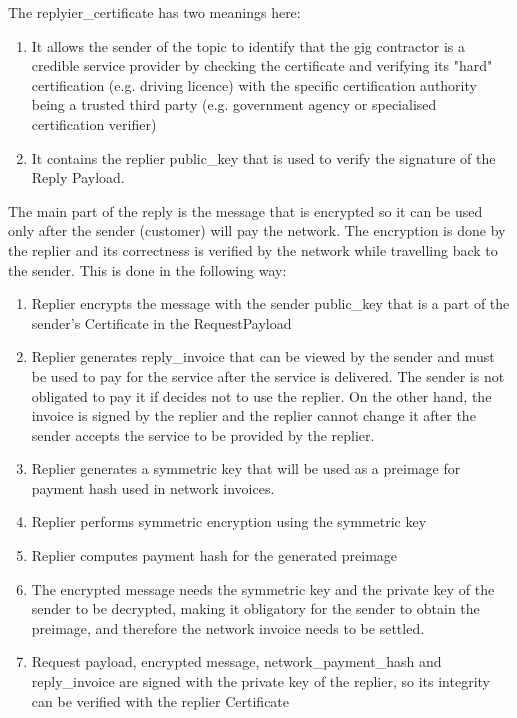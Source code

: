\documentclass{article}
\begin{document}
The replyier\_certificate has two meanings here:

\begin{enumerate}
	\item It allows the sender of the topic to identify that the gig contractor is a credible service provider by checking the certificate and verifying its "hard" certification (e.g. driving licence) with the specific certification authority being a trusted third party (e.g. government agency or specialised certification verifier)
	\item It contains the replier public\_key that is used to verify the signature of the Reply Payload.
\end{enumerate}

The main part of the reply is the message that is encrypted so it can be used only after the sender (customer) will pay the network. The encryption is done by the replier and its correctness is verified by the network while travelling back to the sender. This is done in the following way:

\begin{enumerate}
	\item Replier encrypts the message with the sender public\_key that is a part of the sender's Certificate in the RequestPayload
	\item Replier generates reply\_invoice that can be viewed by the sender and must be used to pay for the service after the service is delivered. The sender is not obligated to pay it if decides not to use the replier. On the other hand, the invoice is signed by the replier and the replier cannot change it after the sender accepts the service to be provided by the replier.
	\item Replier generates a symmetric key that will be used as a preimage for payment hash used in network invoices.
	\item Replier performs symmetric encryption using the symmetric key
	\item Replier computes payment hash for the generated preimage
	\item The encrypted message needs the symmetric key and the private key of the sender to be decrypted, making it obligatory for the sender to obtain the preimage, and therefore the network invoice needs to be settled.
	\item Request payload, encrypted message, network\_payment\_hash and reply\_invoice are signed with the private key of the replier, so its integrity can be verified with the replier Certificate
\end{enumerate}
\end{document}
